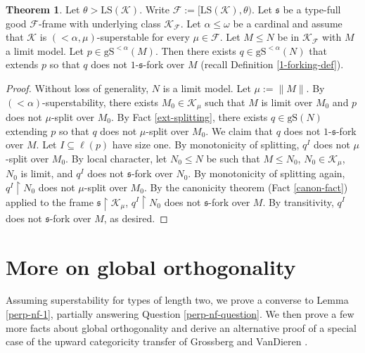 \documentclass[12pt]{amsart}
\theoremstyle{definition}
\newtheorem{thm}[mydef]{Theorem}
\begin{document}
\begin{thm}\label{piecewise-ext}
  Let $\theta > {\text{LS}} ({\mathcal{K}})$. Write ${\mathcal{F}} := [{\text{LS}} ({\mathcal{K}}), \theta)$. Let ${\mathfrak{s}}$ be a type-full good ${\mathcal{F}}$-frame with underlying class ${\mathcal{K}}_{\mathcal{F}}$. Let $\alpha \le \omega$ be a cardinal and assume that ${\mathcal{K}}$ is $(<\alpha, \mu)$-superstable for every $\mu \in {\mathcal{F}}$. Let $M {\le} N$ be in ${\mathcal{K}}_{\mathcal{F}}$ with $M$ a limit model. Let $p \in {\text{gS}}^{<\alpha} (M)$. Then there exists $q \in {\text{gS}}^{<\alpha} (N)$ that extends $p$ so that $q$ does not $1$-${\mathfrak{s}}$-fork over $M$ (recall Definition \ref{1-forking-def}).
\end{thm}
\begin{proof}
  Without loss of generality, $N$ is a limit model. Let $\mu := \|M\|$. By $(<\alpha)$-superstability, there exists $M_0 \in {\mathcal{K}}_{\mu}$ such that $M$ is limit over $M_0$ and $p$ does not $\mu$-split over $M_0$. By Fact \ref{ext-splitting}, there exists $q \in {\text{gS}} (N)$ extending $p$ so that $q$ does not $\mu$-split over $M_0$. We claim that $q$ does not $1$-${\mathfrak{s}}$-fork over $M$. Let $I \subseteq \ell (p)$ have size one. By monotonicity of splitting, $q^I$ does not $\mu$-split over $M_0$. By local character, let $N_0 {\le} N$ be such that $M {\le} N_0$, $N_0 \in {\mathcal{K}}_\mu$, $N_0$ is limit, and $q^I$ does not ${\mathfrak{s}}$-fork over $N_0$. By monotonicity of splitting again, $q^I {\upharpoonright} N_0$ does not $\mu$-split over $M_0$. By the canonicity theorem (Fact \ref{canon-fact}) applied to the frame ${\mathfrak{s}} {\upharpoonright} {\mathcal{K}}_\mu$, $q^I {\upharpoonright} N_0$ does not ${\mathfrak{s}}$-fork over $M$. By transitivity, $q^I$ does not ${\mathfrak{s}}$-fork over $M$, as desired.
\end{proof}

\section{More on global orthogonality}

Assuming superstability for types of length two, we prove a converse to Lemma \ref{perp-nf-1}, partially answering Question \ref{perp-nf-question}. We then prove a few more facts about global orthogonality and derive an alternative proof of a special case of the upward categoricity transfer of Grossberg and VanDieren \cite{tamenessthree}.
\end{document}
